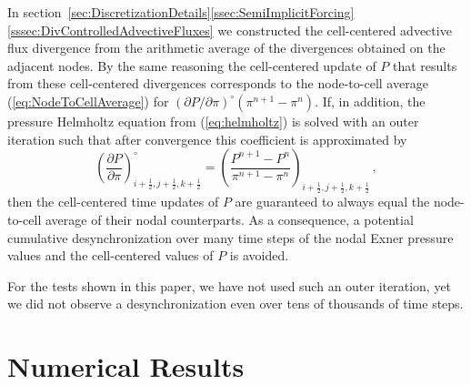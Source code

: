 \documentclass{ametsoc}
\theoremstyle{definition}
\newcommand{\eq}[1]{(\ref{#1})}
\newcommand{\halff}{\frac{1}{2}}
\begin{document}
In section~\ref{sec:DiscretizationDetails}\ref{ssec:SemiImplicitForcing}\ref{sssec:DivControlledAdvectiveFluxes} we constructed the cell-centered advective flux divergence from the arithmetic
average of the divergences obtained on the adjacent nodes. By the same 
reasoning the cell-centered update of $P$ that results
from these cell-centered divergences corresponds to the node-to-cell average 
\eq{eq:NodeToCellAverage} for 
$(\partial P/\partial \pi)^{\circ} (\pi^{n+1}-\pi^{n})$.
If, in addition, the pressure Helmholtz equation from \eq{eq:helmholtz} is
solved with an outer iteration such that after convergence this coefficient
is approximated by  
%
\begin{equation}
\left(\frac{\partial P}{\partial \pi}\right)^{\circ}_{i+\halff,j+\halff,k+\halff}
= \left(\frac{P^{n+1} - P^{n}}{\pi^{n+1} - \pi^{n}}\right)_{i+\halff,j+\halff,k+\halff}\,,
\end{equation}
%
then the cell-centered time updates of $P$ are guaranteed to always equal the
node-to-cell average of their nodal counterparts. As a consequence, a potential
cumulative desynchronization over many time steps of the nodal Exner pressure 
values and the cell-centered values of $P$ is avoided. 

For the tests shown in this paper, we have not used such an outer iteration, yet we did not observe a desynchronization even over tens of thousands of time steps. 



\section{Numerical Results}
\label{sec:Results}
\end{document}
